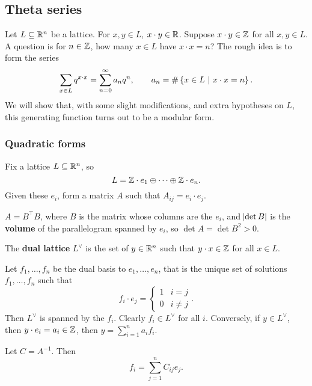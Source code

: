 \pagebreak

\subsection{Theta series}

Let $ L \subseteq \mathbb{R}^n $ be a lattice. For $ x, y \in L $, $ x \cdot y \in \mathbb{R} $. Suppose $ x \cdot y \in \mathbb{Z} $ for all $ x, y \in L $. A question is for $ n \in \mathbb{Z} $, how many $ x \in L $ have $ x \cdot x = n $? The rough idea is to form the series
$$ \sum_{x \in L} q^{x \cdot x} = \sum_{n = 0}^\infty a_nq^n, \qquad a_n = \#\cbr{x \in L \st x \cdot x = n}. $$
We will show that, with some slight modifications, and extra hypotheses on $ L $, this generating function turns out to be a modular form.

\subsubsection{Quadratic forms}

Fix a lattice $ L \subseteq \mathbb{R}^n $, so
$$ L = \mathbb{Z} \cdot e_1 \oplus \dots \oplus \mathbb{Z} \cdot e_n. $$
Given these $ e_i $, form a matrix $ A $ such that $ A_{ij} = e_i \cdot e_j $.

\begin{note*}
$ A = B^\intercal B $, where $ B $ is the matrix whose columns are the $ e_i $, and $ \abs{\det B} $ is the \textbf{volume} of the parallelogram spanned by $ e_i $, so $ \det A = \det B^2 > 0 $.
\end{note*}

\begin{definition}
The \textbf{dual lattice} $ L^\vee $ is the set of $ y \in \mathbb{R}^n $ such that $ y \cdot x \in \mathbb{Z} $ for all $ x \in L $.
\end{definition}

Let $ f_1, \dots, f_n $ be the dual basis to $ e_1, \dots, e_n $, that is the unique set of solutions $ f_1, \dots, f_n $ such that
$$ f_i \cdot e_j =
\begin{cases}
1 & i = j \\
0 & i \ne j
\end{cases}.
$$
Then $ L^\vee $ is spanned by the $ f_i $. Clearly $ f_i \in L^\vee $ for all $ i $. Conversely, if $ y \in L^\vee $, then $ y \cdot e_i = a_i \in \mathbb{Z} $, then $ y = \sum_{i = 1}^n a_if_i $.

\begin{proposition}
Let $ C = A^{-1} $. Then
$$ f_i = \sum_{j = 1}^n C_{ij}e_j. $$
\end{proposition}

